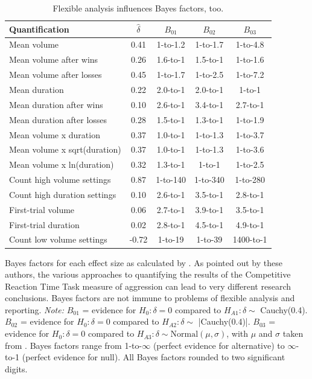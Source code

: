 \documentclass[man]{apa6}
\begin{document}
\begin{table}
\caption{Flexible analysis influences Bayes factors, too.}
\begin{center}
\begin{tabular}{lcccc}
Quantification&$\hat{\delta}$&$B_{01}$&$B_{02}$&$B_{03}$ \\ \hline
Mean volume&0.41&1-to-1.2&1-to-1.7&1-to-4.8 \\
Mean volume after wins&0.26&1.6-to-1&1.5-to-1&1-to-1.6 \\
Mean volume after losses &0.45&1-to-1.7&1-to-2.5&1-to-7.2 \\
Mean duration &0.22&2.0-to-1&2.0-to-1&1-to-1 \\
Mean duration after wins&0.10&2.6-to-1&3.4-to-1&2.7-to-1 \\
Mean duration after losses &0.28&1.5-to-1&1.3-to-1&1-to-1.9 \\
Mean volume x duration &0.37&1.0-to-1&1-to-1.3&1-to-3.7 \\
Mean volume x sqrt(duration)&0.37&1.0-to-1&1-to-1.3&1-to-3.6 \\
Mean volume x ln(duration) &0.32&1.3-to-1&1-to-1&1-to-2.5 \\ 
Count high volume settings &0.87&1-to-140&1-to-340&1-to-280 \\
Count high duration settings &0.10&2.6-to-1&3.5-to-1&2.8-to-1 \\
First-trial volume &0.06&2.7-to-1&3.9-to-1&3.5-to-1 \\ 
First-trial duration&0.02&2.8-to-1&4.5-to-1&4.9-to-1 \\
Count low volume settings&-0.72&1-to-19&1-to-39&1400-to-1 \\ \hline
\end{tabular}
\end{center}

\vspace{4mm}
Bayes factors for each effect size as calculated by \citet[study 2, table 2]{Elson:etal:2014}. As pointed out by these authors, the various approaches to quantifying the results of the Competitive Reaction Time Task measure of aggression can lead to very different research conclusions. Bayes factors are not immune to problems of flexible analysis and reporting. {\em Note:} $B_{01}$ = evidence for $H_0: \delta = 0$ compared to $H_{A1}: \delta \sim$ Cauchy(0.4). $B_{02}$ = evidence for $H_0: \delta = 0$ compared to $H_{A2}: \delta \sim$ |Cauchy(0.4)|. $B_{03}$ = evidence for $H_0: \delta = 0$ compared to $H_{A3}: \delta \sim \mbox{Normal}(\mu, \sigma)$, with $\mu$ and $\sigma$ taken from \citet{Anderson:etal:2010}. Bayes factors range from 1-to-$\infty$ (perfect evidence for alternative) to $\infty$-to-1 (perfect evidence for null). All Bayes factors rounded to two significant digits.
\label{ElsonCRTTHacking}
\end{table}

\newpage


\end{document}
